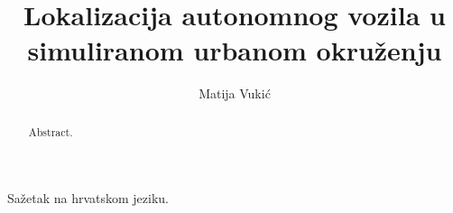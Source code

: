 \documentclass[times, utf8, diplomski]{fer}
\begin{document}

\title{Lokalizacija autonomnog vozila u simuliranom urbanom okruženju}

\author{Matija Vukić}

\maketitle

\izvornik


\tableofcontents









\begin{sazetak}
Sažetak na hrvatskom jeziku.

\end{sazetak}

\begin{abstract}
Abstract.

\end{abstract}
\end{document}

